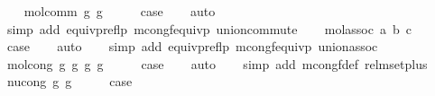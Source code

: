 \begin{isabellebody}
\isamarkupfalse%
\isanewline
\ \ \isamarkupfalse%
\ {\isacharparenleft}{\kern0pt}mol{\isacharunderscore}{\kern0pt}comm\ g{}\ g{}{\isacharparenright}{\kern0pt}\isanewline
\ \ \isamarkupfalse%
\ \isamarkupfalse%
\ {\isacharquery}{\kern0pt}case\isanewline
\ \ \isamarkupfalse%
\ auto\isanewline
\ \ \isamarkupfalse%
\ {\isacharparenleft}{\kern0pt}simp\ add{\isacharcolon}{\kern0pt}\ equivp{\isacharunderscore}{\kern0pt}reflp\ mcong{\isacharunderscore}{\kern0pt}f{\isacharunderscore}{\kern0pt}equivp\ union{\isacharunderscore}{\kern0pt}commute{\isacharparenright}{\kern0pt}\isanewline
{}\isamarkupfalse%
\isanewline
\ \ \isamarkupfalse%
\ {\isacharparenleft}{\kern0pt}mol{\isacharunderscore}{\kern0pt}assoc\ a\ b\ c{\isacharparenright}{\kern0pt}\isanewline
\ \ \isamarkupfalse%
\ \isamarkupfalse%
\ {\isacharquery}{\kern0pt}case\isanewline
\ \ \isamarkupfalse%
\ auto\isanewline
\ \ \isamarkupfalse%
\ {\isacharparenleft}{\kern0pt}simp\ add{\isacharcolon}{\kern0pt}\ equivp{\isacharunderscore}{\kern0pt}reflp\ mcong{\isacharunderscore}{\kern0pt}f{\isacharunderscore}{\kern0pt}equivp\ union{\isacharunderscore}{\kern0pt}assoc{\isacharparenright}{\kern0pt}\isanewline
{}\isamarkupfalse%
\isanewline
\ \ \isamarkupfalse%
\ {\isacharparenleft}{\kern0pt}mol{\isacharunderscore}{\kern0pt}cong\ g{}\ g{}{\isacharprime}{\kern0pt}\ g{}\ g{}{\isacharprime}{\kern0pt}{\isacharparenright}{\kern0pt}\isanewline
\ \ \isamarkupfalse%
\ \isamarkupfalse%
\ {\isacharquery}{\kern0pt}case\isanewline
\ \ \isamarkupfalse%
\ auto\isanewline
\ \ \isamarkupfalse%
\ {\isacharparenleft}{\kern0pt}simp\ add{\isacharcolon}{\kern0pt}\ mcong{\isacharunderscore}{\kern0pt}f{\isacharunderscore}{\kern0pt}def\ rel{\isacharunderscore}{\kern0pt}mset{\isacharunderscore}{\kern0pt}plus{\isacharparenright}{\kern0pt}\isanewline
{}\isamarkupfalse%
\isanewline
\ \ \isamarkupfalse%
\ {\isacharparenleft}{\kern0pt}nu{\isacharunderscore}{\kern0pt}cong\ g\ g{\isacharprime}{\kern0pt}{\isacharparenright}{\kern0pt}\isanewline
\ \ \isamarkupfalse%
\ \isamarkupfalse%
\ {\isacharquery}{\kern0pt}case\isanewline
\ \ \isamarkupfalse%

\end{isabellebody}
